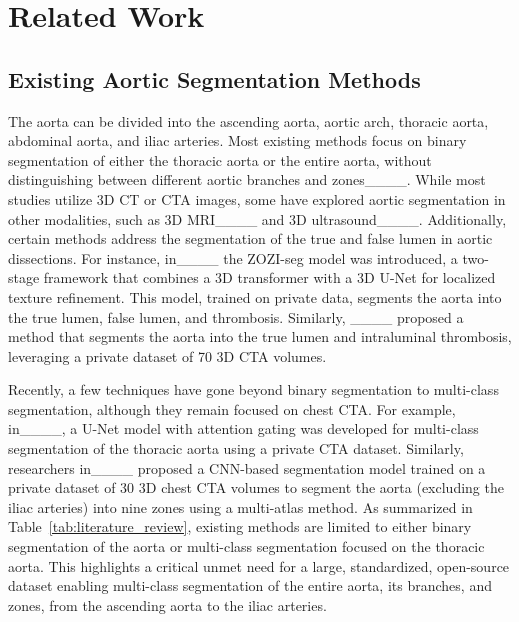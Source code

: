 \section{Related Work}
\label{sect:prior-work}
\subsection{Existing Aortic Segmentation Methods}
\label{sect:related-work}

The aorta can be divided into the ascending aorta, aortic arch, thoracic aorta, abdominal aorta, and iliac arteries. Most existing methods focus on binary segmentation of either the thoracic aorta or the entire aorta, without distinguishing between different aortic branches and zones____. While most studies utilize 3D CT or CTA images, some have explored aortic segmentation in other modalities, such as 3D MRI____ and 3D ultrasound____. Additionally, certain methods address the segmentation of the true and false lumen in aortic dissections. For instance, in____ the ZOZI-seg model was introduced, a two-stage framework that combines a 3D transformer with a 3D U-Net for localized texture refinement. This model, trained on private data, segments the aorta into the true lumen, false lumen, and thrombosis. Similarly, ____ proposed a method that segments the aorta into the true lumen and intraluminal thrombosis, leveraging a private dataset of 70 3D CTA volumes. 

Recently, a few techniques have gone beyond binary segmentation to multi-class segmentation, although they remain focused on chest CTA. For example, in____, a U-Net model with attention gating was developed for multi-class segmentation of the thoracic aorta using a private CTA dataset. Similarly, researchers in____ proposed a CNN-based segmentation model trained on a private dataset of 30 3D chest CTA volumes to segment the aorta (excluding the iliac arteries) into nine zones using a multi-atlas method. As summarized in Table~\ref{tab:literature_review}, existing methods are limited to either binary segmentation of the aorta or multi-class segmentation focused on the thoracic aorta. This highlights a critical unmet need for a large, standardized, open-source dataset enabling multi-class segmentation of the entire aorta, its branches, and zones, from the ascending aorta to the iliac arteries.

